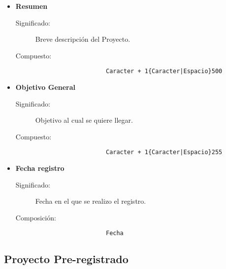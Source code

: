 \begin{itemize}
	\item	\textbf{Resumen}
		\begin{description}
			\item[Significado:]Breve descripción del Proyecto.
			\item[Compuesto:]{\begin{lstlisting}
					Caracter + 1{Caracter|Espacio}500\end{lstlisting}}
		\end{description}

	\item	\textbf{Objetivo General}
		\begin{description}
			\item[Significado:]Objetivo al cual se quiere llegar.
			\item[Compuesto:]{\begin{lstlisting}
					Caracter + 1{Caracter|Espacio}255\end{lstlisting}}
		\end{description}
	\item	\textbf{Fecha registro}
		\begin{description}
			\item[Significado:]Fecha en el que se realizo el registro.
			\item[Composición:]{\begin{lstlisting}
					Fecha\end{lstlisting}}
		\end{description}
\end{itemize}


\subsection{Proyecto Pre-registrado}
\label{dd:ProyectoPreregistrado}


